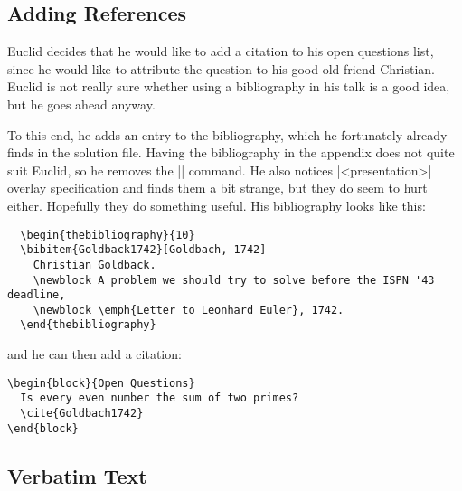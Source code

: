 \subsection{Adding References}

Euclid decides that he would like to add a citation to his open
questions list, since he would like to attribute the question to his
good old friend Christian. Euclid is not really sure whether using a
bibliography in his talk is a good idea, but he goes ahead anyway. 

To this end, he adds an entry to the bibliography, which he
fortunately already finds in the solution file. Having the
bibliography in the appendix does not quite suit Euclid, so he removes
the |\appendix| command. He also notices |<presentation>| overlay
specification and finds them a bit strange, but they do seem to hurt
either. Hopefully they do something useful. His bibliography looks
like this:
\begin{verbatim}
  \begin{thebibliography}{10}
  \bibitem{Goldback1742}[Goldbach, 1742]
    Christian Goldback.
    \newblock A problem we should try to solve before the ISPN '43 deadline, 
    \newblock \emph{Letter to Leonhard Euler}, 1742.
  \end{thebibliography}
\end{verbatim}
and he can then add a citation:
\begin{verbatim}
\begin{block}{Open Questions}
  Is every even number the sum of two primes?
  \cite{Goldbach1742}
\end{block}
\end{verbatim}





\subsection{Verbatim Text}

